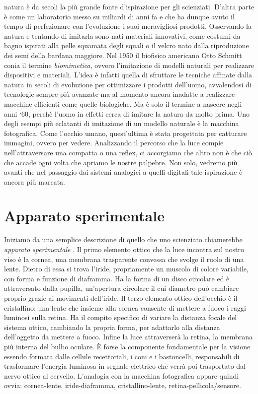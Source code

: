  natura è da secoli la più grande fonte d'ispirazione per gli scienziati. D'altra parte è come un laboratorio messo su miliardi di anni fa e che ha dunque avuto il tempo di perfezionare con l'evoluzione i suoi meravigliosi prodotti. Osservando la natura e tentando di imitarla sono nati materiali innovativi, come costumi da bagno ispirati alla pelle squamata degli squali o il velcro nato dalla riproduzione dei semi della bardana maggiore. Nel 1950 il biofisico americano Otto Schmitt conia il termine \emph{biomimetica}, ovvero l'imitazione di modelli naturali per realizzare dispositivi e materiali. L'idea è infatti quella di sfruttare le tecniche affinate dalla natura in secoli di evoluzione per ottimizzare i prodotti dell'uomo, avvalendosi di tecnologie sempre più avanzate ma al momento ancora inadatte a realizzare macchine efficienti come quelle biologiche. Ma è solo il termine a nascere negli anni ‘60, perchè l'uomo in effetti cerca di imitare la natura da molto prima. 
Uno degli esempi più eclatanti di imitazione di un modello naturale è la macchina fotografica. Come l'occhio umano, quest'ultima è stata progettata per catturare immagini, ovvero per vedere. Analizzando il percorso che la luce compie nell'attraversare una compatta o una reflex, ci accorgiamo che altro non è che ciò che accade ogni volta che apriamo le nostre palpebre. Non solo, vedremo più avanti che nel passaggio dai sistemi analogici a quelli digitali tale ispirazione è ancora più marcata.

\section*{Apparato sperimentale}
Iniziamo da una semplice descrizione di quello che uno scienziato chiamerebbe \emph{apparato sperimentale} \cite{mencuccini}. Il primo elemento ottico che la luce incontra sul nostro viso è la cornea, una membrana trasparente convessa che svolge il ruolo di una lente. Dietro di essa si trova l'iride, propriamente un muscolo di colore variabile, con forma e funzione di diaframma. Ha la forma di un disco circolare ed è attraversato dalla pupilla, un'apertura circolare il cui diametro può cambiare proprio grazie ai movimenti dell'iride. Il terzo elemento ottico dell'occhio è il cristallino: una lente che insieme alla cornea consente di mettere a fuoco i raggi luminosi sulla retina. Ha il compito specifico di variare la distanza focale del sistema ottico, cambiando la propria forma, per adattarlo alla distanza dell'oggetto da mettere a fuoco. Infine la luce attraverserà la retina, la membrana più interna del bulbo oculare. È forse la componente fondamentale per la visione essendo formata dalle cellule recettoriali, i coni e i bastoncelli, responsabili di trasformare l'energia luminosa in segnale elettrico che verrà poi trasportato dal nervo ottico al cervello. L'analogia con la macchina fotografica appare quindi ovvia: cornea-lente, iride-diaframma, cristallino-lente, retina-pellicola/sensore.

